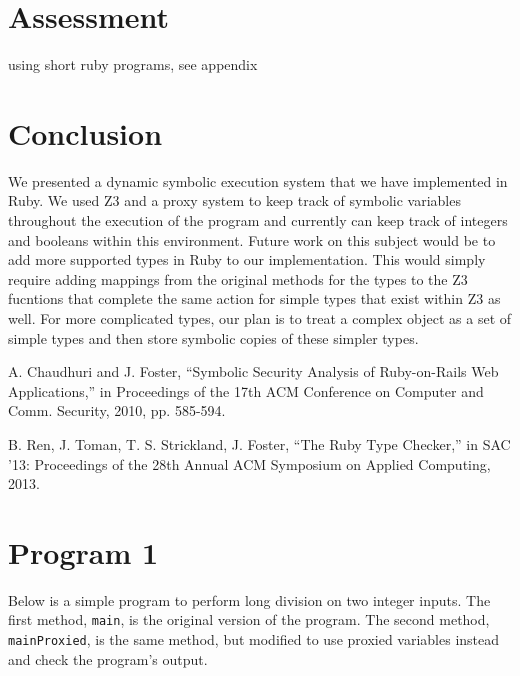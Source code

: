 \documentclass[10pt]{article}
\begin{document}
\section{Assessment}
using short ruby programs, see appendix

\section{Conclusion}
We presented a dynamic symbolic execution system  that we have implemented in Ruby.  We used Z3 and a proxy system to keep track of symbolic variables throughout the execution of the program and currently can keep track of integers and booleans within this environment.  Future work on this subject would be to add more supported types in Ruby to our implementation.  This would simply require adding mappings from the original methods for the types to the Z3 fucntions that complete the same action for simple types that exist within Z3 as well.  For more complicated types, our plan is to treat a complex object as a set of simple types and then store symbolic copies of these simpler types.\\

\begin{thebibliography}{99}
A. Chaudhuri and J. Foster, ``Symbolic Security Analysis of Ruby-on-Rails Web Applications,'' in Proceedings of the 17th ACM Conference on Computer and Comm. Security, 2010, pp. 585-594.

B. Ren, J. Toman, T. S. Strickland, J. Foster, ``The Ruby Type Checker,'' in SAC '13: Proceedings of the 28th Annual ACM Symposium on Applied Computing, 2013.

\end{thebibliography}

\appendix

\section{Program 1}
Below is a simple program to perform long division on two integer inputs.  The first method, \texttt{main}, is the original version of the program.  The second method, \texttt{mainProxied}, is the same method, but modified to use proxied variables instead and check the program's output.\\
\end{document}
